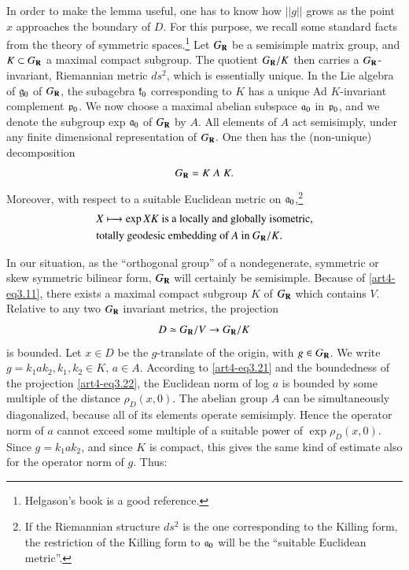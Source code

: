 In order to make the lemma useful, one has to know how $||g||$ grows as the point $x$ approaches the boundary of $D$. For this purpose, we recall some standard facts from the theory of symmetric spaces.\footnote[11]{Helgason's book \cite{art4-key27} is a good reference.} Let $G_{\mathbf{R}}$ be a semisimple matrix group, and $K \subset G_{\mathbf{R}}$ a maximal compact subgroup. The quotient $G_{\mathbf{R}} / K$ then carries a $G_{\mathbf{R}}$-invariant, Riemannian metric $ds^2$, which is essentially unique. In the Lie algebra of $\mathfrak{g}_0$ of $G_{\mathbf{R}}$, the subagebra $\mathfrak{k}_0$ corresponding to $K$ has a unique Ad $K$-invariant complement $\mathfrak{p}_0$. We now choose a maximal abelian subspace $\mathfrak{a}_0$ in $\mathfrak{p}_0$, and we denote the subgroup exp $\mathfrak{a}_0$ of $G_{\mathbf{R}}$ by $A$. All elements of $A$ act semisimply, under any finite dimensional representation of $G_{\mathbf{R}}$. One then has the (non-unique) decomposition
\begin{equation}\label{art4-eq3.20}
G_{\mathbf{R}} = K \; A  \; K.
\end{equation}\pageoriginale
Moreover, with respect to a suitable Euclidean metric on $\mathfrak{a}_0$,\footnote[12]{If the Riemannian structure $ds^2$ is the one corresponding to the Killing form, the restriction of the Killing form to $\mathfrak{a}_0$ will be the ``suitable Euclidean metric''.}
\begin{align}
& X \longmapsto \exp XK \text{ is a locally and globally isometric,}   \notag\\
& \text{totally geodesic embedding of $A$ in $G_{\mathbf{R}}/K$.} \label{art4-eq3.21}
\end{align}

In our situation, as the ``orthogonal group'' of a nondegenerate, symmetric or skew symmetric bilinear form, $G_{\mathbf{R}}$ will certainly be semisimple. Because of \eqref{art4-eq3.11}, there exists a maximal compact subgroup $K$ of $G_{\mathbf{R}}$ which contains $V$. Relative to any two $G_{\mathbf{R}}$ invariant metrics, the projection
\begin{equation}
D\simeq G_{\mathbf{R}} / V \to G_{\mathbf{R}} / K
\label{art4-eq3.22}
\end{equation}
is bounded. Let $x \in D$ be the $g$-translate of the origin, with $g \in G_{\mathbf{R}}$. We write $g = k_1 a k_2, k_1, k_2 \in K$, $a \in A$. According to \eqref{art4-eq3.21} and the boundedness of the projection \eqref{art4-eq3.22}, the Euclidean norm of log $a$ is bounded by some multiple of the distance $\rho_D (x,0)$. The abelian group $A$ can be simultaneously diagonalized, because all of its elements operate semisimply. Hence the operator norm of $a$ cannot exceed some multiple of a suitable power of $\exp \rho_D (x, 0)$. Since $g = k_1 a k_2$, and since $K$ is compact, this gives the same kind of estimate also for the operator norm of $g$. Thus:

